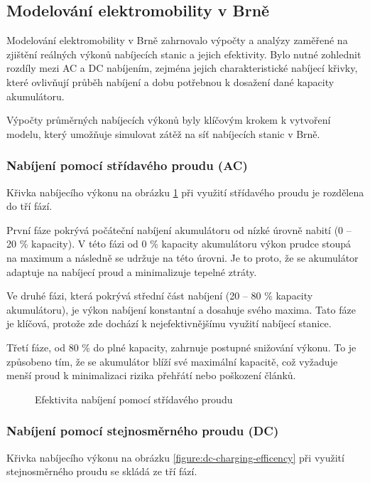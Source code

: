 \documentclass[a4paper,11pt]{article}
\begin{document}
\subsection{Modelování elektromobility v Brně}
Modelování elektromobility v Brně zahrnovalo výpočty a analýzy zaměřené na zjištění reálných výkonů nabíjecích stanic a
jejich efektivity. Bylo nutné zohlednit rozdíly mezi AC a DC nabíjením, zejména jejich charakteristické nabíjecí křivky,
které ovlivňují průběh nabíjení a dobu potřebnou k dosažení dané kapacity akumulátoru.

Výpočty průměrných nabíjecích výkonů byly klíčovým krokem k vytvoření modelu, který umožňuje simulovat zátěž na síť
nabíjecích stanic v Brně.

\subsubsection{Nabíjení pomocí střídavého proudu (AC)}
Křivka nabíjecího výkonu na obrázku \ref{figure:ac-charging-efficency} při využití střídavého proudu je rozdělena do tří fází.

První fáze pokrývá počáteční nabíjení akumulátoru od nízké úrovně nabití (0 -- 20 \% kapacity). V této fázi od 0 \%
kapacity akumulátoru výkon prudce stoupá na maximum a následně se udržuje na této úrovni. Je to proto, že se akumulátor
adaptuje na nabíjecí proud a minimalizuje tepelné ztráty.

Ve druhé fázi, která pokrývá střední část nabíjení (20 -- 80 \% kapacity akumulátoru), je výkon nabíjení konstantní a
dosahuje svého maxima. Tato fáze je klíčová, protože zde dochází k nejefektivnějšímu využití nabíjecí stanice.

Třetí fáze, od 80 \% do plné kapacity, zahrnuje postupné snižování výkonu. To je způsobeno tím, že se akumulátor blíží
své maximální kapacitě, což vyžaduje menší proud k minimalizaci rizika přehřátí nebo poškození článků.
\cite{bacancy_ac_vs_dc}

\begin{figure}[H]
    \centering
    \caption{Efektivita nabíjení pomocí střídavého proudu \cite{evbox_ac_dc}}
    \label{figure:ac-charging-efficency}
\end{figure}

\subsubsection{Nabíjení pomocí stejnosměrného proudu (DC)}
Křivka nabíjecího výkonu na obrázku \ref{figure:dc-charging-efficency} při využití stejnosměrného proudu se skládá ze tří fází.
\end{document}
